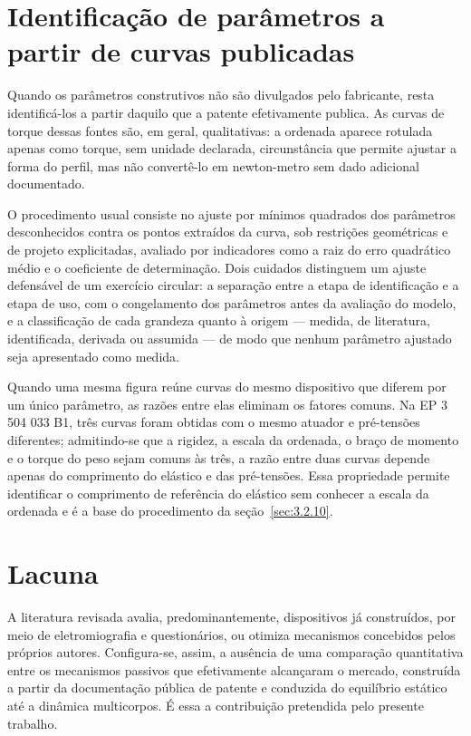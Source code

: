 \section{Identificação de parâmetros a partir de curvas publicadas}\label{sec:2.10}

Quando os parâmetros construtivos não são divulgados pelo fabricante, resta identificá-los a partir daquilo que a patente efetivamente publica. As curvas de torque dessas fontes são, em geral, qualitativas: a ordenada aparece rotulada apenas como torque, sem unidade declarada, circunstância que permite ajustar a forma do perfil, mas não convertê-lo em newton-metro sem dado adicional documentado.

O procedimento usual consiste no ajuste por mínimos quadrados dos parâmetros desconhecidos contra os pontos extraídos da curva, sob restrições geométricas e de projeto explicitadas, avaliado por indicadores como a raiz do erro quadrático médio e o coeficiente de determinação. Dois cuidados distinguem um ajuste defensável de um exercício circular: a separação entre a etapa de identificação e a etapa de uso, com o congelamento dos parâmetros antes da avaliação do modelo, e a classificação de cada grandeza quanto à origem — medida, de literatura, identificada, derivada ou assumida — de modo que nenhum parâmetro ajustado seja apresentado como medida.

Quando uma mesma figura reúne curvas do mesmo dispositivo que diferem por um único parâmetro, as razões entre elas eliminam os fatores comuns. Na EP 3 504 033 B1, três curvas foram obtidas com o mesmo atuador e pré-tensões diferentes; admitindo-se que a rigidez, a escala da ordenada, o braço de momento e o torque do peso sejam comuns às três, a razão entre duas curvas depende apenas do comprimento do elástico e das pré-tensões. Essa propriedade permite identificar o comprimento de referência do elástico sem conhecer a escala da ordenada e é a base do procedimento da seção~\ref{sec:3.2.10}.

\section{Lacuna}\label{sec:2.11}

A literatura revisada avalia, predominantemente, dispositivos já construídos, por meio de eletromiografia e questionários, ou otimiza mecanismos concebidos pelos próprios autores. Configura-se, assim, a ausência de uma comparação quantitativa entre os mecanismos passivos que efetivamente alcançaram o mercado, construída a partir da documentação pública de patente e conduzida do equilíbrio estático até a dinâmica multicorpos. É essa a contribuição pretendida pelo presente trabalho.
